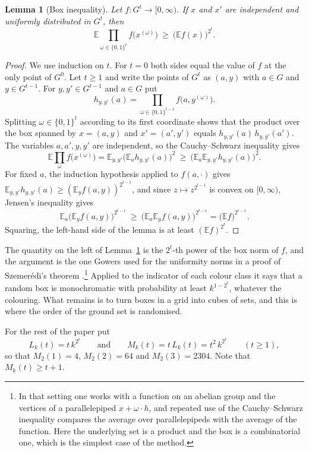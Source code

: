 \documentclass[11pt,reqno]{amsart}
\numberwithin{equation}{section}
\theoremstyle{plain}
\newtheorem{lemma}[theorem]{Lemma}
\theoremstyle{definition}
\theoremstyle{remark}
\newcommand{\Ex}{\mathbb{E}}
\begin{document}
\begin{lemma}[Box inequality]
\label{lem:box}
Let $f:G^{t}\to[0,\infty)$. If $x$ and $x'$ are independent and uniformly
distributed in $G^{t}$, then
\[
\Ex\prod_{\omega\in\{0,1\}^{t}}f\bigl(x^{(\omega)}\bigr)\ \ge\
\bigl(\Ex f(x)\bigr)^{2^{t}} .
\]
\end{lemma}

\begin{proof}
We use induction on $t$. For $t=0$ both sides equal the value of $f$ at
the only point of $G^{0}$. Let $t\ge1$ and write the points of $G^{t}$ as
$(a,y)$ with $a\in G$ and $y\in G^{t-1}$. For $y,y'\in G^{t-1}$ and $a\in
G$ put
\[
h_{y,y'}(a)=\prod_{\omega\in\{0,1\}^{t-1}}f\bigl(a,y^{(\omega)}\bigr).
\]
Splitting $\omega\in\{0,1\}^{t}$ according to its first coordinate shows
that the product over the box spanned by $x=(a,y)$ and $x'=(a',y')$ equals
$h_{y,y'}(a)\,h_{y,y'}(a')$. The variables $a,a',y,y'$ are independent,
so the Cauchy--Schwarz inequality gives
\[
\Ex\prod_{\omega}f\bigl(x^{(\omega)}\bigr)
=\Ex_{y,y'}\bigl(\Ex_a h_{y,y'}(a)\bigr)^{2}
\ \ge\ \bigl(\Ex_{a}\Ex_{y,y'}h_{y,y'}(a)\bigr)^{2}.
\]
For fixed $a$, the induction hypothesis applied to $f(a,\cdot)$ gives
$\Ex_{y,y'}h_{y,y'}(a)\ge(\Ex_yf(a,y))^{2^{t-1}}$, and since $z\mapsto
z^{2^{t-1}}$ is convex on $[0,\infty)$, Jensen's inequality gives
\[
\Ex_a\bigl(\Ex_yf(a,y)\bigr)^{2^{t-1}}\ \ge\
\bigl(\Ex_a\Ex_yf(a,y)\bigr)^{2^{t-1}}=\bigl(\Ex f\bigr)^{2^{t-1}}.
\]
Squaring, the left-hand side of the lemma is at least
$(\Ex f)^{2^{t}}$.
\end{proof}

The quantity on the left of Lemma~\ref{lem:box} is the $2^{t}$-th power
of the box norm of $f$, and the argument is the one Gowers used for the
uniformity norms in a proof of Szemer\'edi's theorem
\cite{Go01}.\footnote{In that setting one works with a function on an
abelian group and the vertices of a parallelepiped $x+\omega\cdot h$, and
repeated use of the Cauchy--Schwarz inequality compares the average over
parallelepipeds with the average of the function. Here the underlying
set is a product and the box is a combinatorial one, which is the
simplest case of the method.} Applied to the indicator of each colour
class it says that a random box is monochromatic with probability at
least $k^{1-2^{t}}$, whatever the colouring. What remains is to turn boxes
in a grid into cubes of sets, and this is where the order of the ground
set is randomised.

For the rest of the paper put
\begin{equation}
\label{eq:Mt}
L_k(t)=t\,k^{2^{t}}\qquad\text{and}\qquad M_k(t)=t\,L_k(t)=t^{2}\,k^{2^{t}}
\qquad(t\ge1),
\end{equation}
so that $M_2(1)=4$, $M_2(2)=64$ and $M_2(3)=2304$. Note that
$M_k(t)\ge t+1$.
\end{document}
